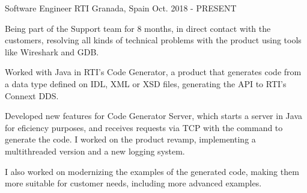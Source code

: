 

\begin{cventries}

  \cventry
    {Software Engineer} %
    {RTI} %
    {Granada, Spain} %
    {Oct. 2018 - PRESENT} %
    {
      \begin{cvitems} %
        \item {Being part of the Support team for 8 months, in direct contact with the customers,
              resolving all kinds of technical problems with the product using tools like Wireshark and GDB.} 
        \item {Worked with Java in RTI's Code Generator, a product that generates code from a data type defined on IDL, XML or XSD files,
              generating the API to RTI's Connext DDS.}
        \item {Developed new features for Code Generator Server, which starts a server in Java for eficiency purposes,
              and receives requests via TCP with the command to generate the code. I worked on the product revamp,
              implementing a multithreaded version and a new logging system.}
        \item {I also worked on modernizing the examples of the generated code, 
              making them more suitable for customer needs, including more advanced examples.}
      \end{cvitems}
    }

\end{cventries}
